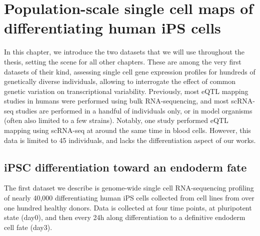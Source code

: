 
\chapter{Population-scale single cell maps of differentiating human iPS cells}

In this chapter, we introduce the two datasets that we will use throughout the thesis, setting the scene for all other chapters. 
These are among the very first datasets of their kind, assessing single cell gene expression profiles for hundreds of genetically diverse individuals, allowing to interrogate the effect of common genetic variation on transcriptional variability.
Previously, most eQTL mapping studies in humans were performed using bulk RNA-sequencing, and most scRNA-seq studies are performed in a handful of individuals only, or in model organisms (often also limited to a few strains).
Notably, one study performed eQTL mapping using scRNA-seq \cite{van2018single} at around the same time in blood cells. However, this data is limited to 45 individuals, and lacks the differentiation aspect of our works.

\section{iPSC differentiation toward an endoderm fate}

The first dataset we describe is genome-wide single cell RNA-sequencing profiling of nearly 40,000 differentiating human iPS cells collected from cell lines from over one hundred healthy donors. 
Data is collected at four time points, at pluripotent state (day0), and then every 24h along differentiation to a definitive endoderm cell fate (day3).

\newpage

